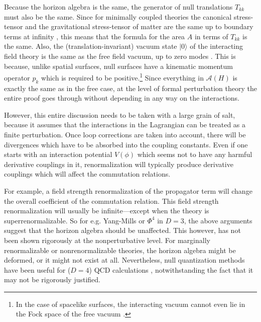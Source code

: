 \documentclass[12pt]{article}
\begin{document}
Because the horizon algebra is the same, the generator of null translations $T_{kk}$ must also be the same.  Since for minimally coupled theories the canonical stress-tensor and the gravitational stress-tensor of matter are the same up to boundary terms at infinity \cite{fursaev99}, this means that the formula for the area $A$ in terms of $T_{kk}$ is the same.  Also, the (translation-invariant) vacuum state $|0\rangle$ of the interacting field theory is the same as the free field vacuum, up to zero modes \cite{burkardt96}.  This is because, unlike spatial surfaces, null surfaces have a kinematic momentum operator $p_k$ which is required to be positive.\footnote{In the case of spacelike surfaces, the interacting vacuum cannot even lie in the Fock space of the free vacuum \cite{EF05}.}  Since everything in $\mathcal{A}(H)$ is exactly the same as in the free case, at the level of formal perturbation theory the entire proof goes through without depending in any way on the interactions.

However, this entire discussion needs to be taken with a large grain of salt, because it assumes that the interactions in the Lagrangian can be treated as a finite perturbation.  Once loop corrections are taken into account, there will be divergences which have to be absorbed into the coupling constants.  Even if one starts with an interaction potential $V(\phi)$ which seems not to have any harmful derivative couplings in it, renormalization will typically produce derivative couplings which will affect the commutation relations.

For example, a field strength renormalization of the propagator term will change the overall coefficient of the commutation relation.  This field strength renormalization will usually be infinite---except when the theory is superrenormalizable.  So for e.g. Yang-Mills or $\Phi^4$ in $D = 3$, the above arguments suggest that the horizon algebra should be unaffected.  This however, has not been shown rigorously at the nonperturbative level.  For marginally renormalizable or nonrenormalizable theories, the horizon algebra might be deformed, or it might not exist at all.  Nevertheless, null quantization methods have been useful for ($D=4$) QCD calculations \cite{burkardt96},  notwithstanding the fact that it may not be rigorously justified.
\end{document}
